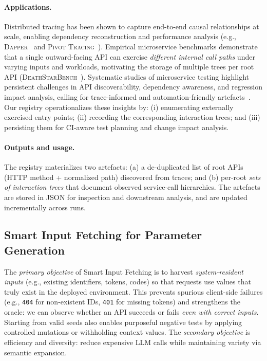 \documentclass[conference]{IEEEtran}
\begin{document}
\paragraph{Applications.}
Distributed tracing has been shown to capture end-to-end causal relationships at scale, enabling dependency reconstruction and performance analysis (e.g., \textsc{Dapper}~\cite{sigelman2010dapper} and \textsc{Pivot Tracing}~\cite{mace2015pivot}). Empirical microservice benchmarks demonstrate that a single outward-facing API can exercise \emph{different internal call paths} under varying inputs and workloads, motivating the storage of multiple trees per root API (\textsc{DeathStarBench}~\cite{gan2020deathstarbench}). Systematic studies of microservice testing highlight persistent challenges in API discoverability, dependency awareness, and regression impact analysis, calling for trace-informed and automation-friendly artefacts~\cite{waseem2020testing}. Our registry operationalizes these insights by: (i) enumerating externally exercised entry points; (ii) recording the corresponding interaction trees; and (iii) persisting them for CI-aware test planning and change impact analysis.

\paragraph{Outputs and usage.}
The registry materializes two artefacts: (a) a de-duplicated list of root APIs (HTTP method + normalized path) discovered from traces; and (b) per-root \emph{sets of interaction trees} that document observed service-call hierarchies. The artefacts are stored in JSON for inspection and downstream analysis, and are updated incrementally across runs.

\subsection{Smart Input Fetching for Parameter Generation}\label{ssec:smartfetch}

The \emph{primary objective} of Smart Input Fetching is to harvest \emph{system-resident inputs} (e.g., existing identifiers, tokens, codes) so that requests use values that truly exist in the deployed environment. This prevents spurious client-side failures (e.g., \texttt{404} for non-existent IDs, \texttt{401} for missing tokens) and strengthens the oracle: we can observe whether an API succeeds or fails \emph{even with correct inputs}. Starting from valid seeds also enables purposeful negative tests by applying controlled mutations or withholding context values. The \emph{secondary objective} is efficiency and diversity: reduce expensive LLM calls while maintaining variety via semantic expansion.
\end{document}
